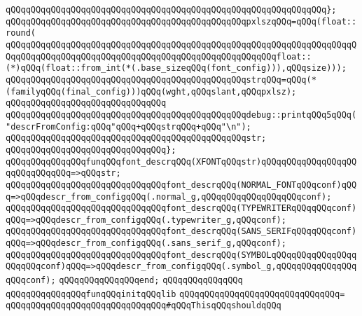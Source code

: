 \verb|qQQqqQQqqQQqqQQqqQQqqQQqqQQqqQQqqQQqqQQqqQQqqQQqqQQqqQQqqQQqqQQq};|\newline
\newline
\verb|qQQqqQQqqQQqqQQqqQQqqQQqqQQqqQQqqQQqqQQqqQQqqQQqpxlszqQQq=qQQq(float::round(|\newline
\verb|qQQqqQQqqQQqqQQqqQQqqQQqqQQqqQQqqQQqqQQqqQQqqQQqqQQqqQQqqQQqqQQqqQQqqQQqqQQqqQQqqQQqqQQqqQQqqQQqqQQqqQQqqQQqqQQqqQQqqQQqqQQqfloat::(*)qQQq(float::from_int(*(.base_sizeqQQq(font_config))),qQQqsize)));|\newline
\verb|qQQqqQQqqQQqqQQqqQQqqQQqqQQqqQQqqQQqqQQqqQQqqQQqstrqQQq=qQQq(*(familyqQQq(final_config)))qQQq(wght,qQQqslant,qQQqpxlsz);|\newline
\verb|qQQqqQQqqQQqqQQqqQQqqQQqqQQqqQQq|\newline
\verb|qQQqqQQqqQQqqQQqqQQqqQQqqQQqqQQqqQQqqQQqqQQqqQQqdebug::printqQQq5qQQq("descrFromConfig:qQQq"qQQq+qQQqstrqQQq+qQQq"\n");|\newline
\verb|qQQqqQQqqQQqqQQqqQQqqQQqqQQqqQQqqQQqqQQqqQQqqQQqstr;|\newline
\verb|qQQqqQQqqQQqqQQqqQQqqQQqqQQqqQQq};|\newline
\newline
\newline
\verb|qQQqqQQqqQQqqQQqfunqQQqfont_descrqQQq(XFONTqQQqstr)qQQqqQQqqQQqqQQqqQQqqQQqqQQqqQQq=>qQQqstr;|\newline
\verb|qQQqqQQqqQQqqQQqqQQqqQQqqQQqqQQqfont_descrqQQq(NORMAL_FONTqQQqconf)qQQq=>qQQqdescr_from_configqQQq(.normal_g,qQQqqQQqqQQqqQQqqQQqconf);|\newline
\verb|qQQqqQQqqQQqqQQqqQQqqQQqqQQqqQQqfont_descrqQQq(TYPEWRITERqQQqqQQqconf)qQQq=>qQQqdescr_from_configqQQq(.typewriter_g,qQQqconf);|\newline
\verb|qQQqqQQqqQQqqQQqqQQqqQQqqQQqqQQqfont_descrqQQq(SANS_SERIFqQQqqQQqconf)qQQq=>qQQqdescr_from_configqQQq(.sans_serif_g,qQQqconf);|\newline
\verb|qQQqqQQqqQQqqQQqqQQqqQQqqQQqqQQqfont_descrqQQq(SYMBOLqQQqqQQqqQQqqQQqqQQqqQQqconf)qQQq=>qQQqdescr_from_configqQQq(.symbol_g,qQQqqQQqqQQqqQQqqQQqconf);|\newline
\verb|qQQqqQQqqQQqqQQqend;|\newline
\newline
\verb|qQQqqQQqqQQqqQQq|\newline
\verb|qQQqqQQqqQQqqQQqfunqQQqinitqQQqlib|\newline
\verb|qQQqqQQqqQQqqQQqqQQqqQQqqQQqqQQq=|\newline
\verb|qQQqqQQqqQQqqQQqqQQqqQQqqQQqqQQq#qQQqThisqQQqshouldqQQq|\newline
